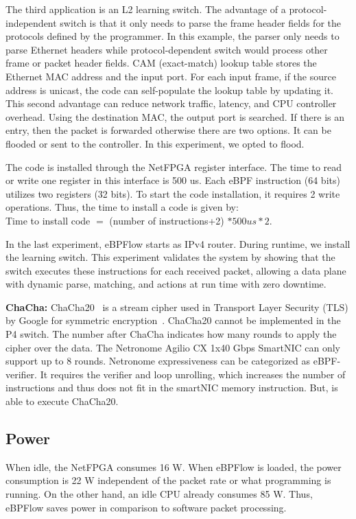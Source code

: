 The third application is an L2 learning switch.
The advantage of a protocol-independent switch is that it only needs to parse the frame header fields for the protocols defined by the programmer. In this example, the parser only needs to parse Ethernet headers while protocol-dependent switch would process other frame or packet header fields. CAM (exact-match) lookup table stores the Ethernet MAC address and the input port. 
For each input frame, if the source address is unicast, the code can self-populate the lookup table by updating it.
This second advantage can reduce network traffic, latency, and CPU controller overhead.
Using the destination MAC, the output port is searched.
If there is an entry, then the packet is forwarded otherwise there are two options. It can be flooded or sent to the controller. In this experiment, we opted to flood.


The code is installed through the NetFPGA register interface.
The time to read or write one register in this interface is 500 us.
Each eBPF instruction (64 bits) utilizes two registers (32 bits).
To start the code installation, it requires 2 write operations.
Thus, the time to install a code is given by:\\
Time to install code $=$ (number of instructions+2) $* 500 us * 2.$ 

In the last experiment, eBPFlow starts as IPv4 router. During runtime, we install the learning switch. This experiment validates the system by showing that the switch executes these instructions for each received packet, allowing a data plane with dynamic parse, matching, and actions at run time with zero downtime.

\textbf{ChaCha:} 
ChaCha20~\cite{rfc8439} is a
stream cipher used in Transport Layer Security (TLS) by Google for symmetric
encryption~\cite{google-chacha}.
ChaCha20 cannot be implemented in the P4 switch.
The number after ChaCha indicates how many rounds to apply the cipher over the data.
The Netronome Agilio CX 1x40 Gbps SmartNIC can only support up to 8 rounds. Netronome expressiveness can be categorized as eBPF-verifier. It requires the verifier and loop unrolling, which increases the number of instructions and thus does not fit in the smartNIC memory instruction.
But, \system is able to execute ChaCha20.




\subsection{Power}

When idle, the NetFPGA consumes 16 W.
When eBPFlow is loaded, the power consumption is 22 W independent of the packet rate or what programming is running.
On the other hand, an idle CPU already consumes 85 W.
Thus, eBPFlow saves power in comparison to software packet processing.


